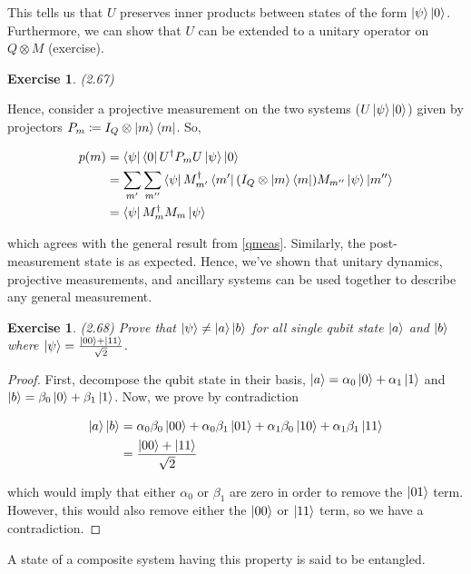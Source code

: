 \documentclass[11pt]{article}
\newcommand\0{\mathbf{0}}
\newcommand\<{\langle}
\renewcommand\>{\rangle}
\newtheorem{exercise}[theorem]{Exercise}
\begin{document}
This tells us that $U$ preserves inner products between states of the form $\ket{\psi}\ket{0}$. Furthermore, we can show that $U$ can be extended to a unitary operator on $Q \otimes M$ (exercise).

\begin{exercise}
(2.67)
\end{exercise}

Hence, consider a projective measurement on the two systems ($U\ket{\psi}\ket{0}$) given by projectors $P_m \coloneqq I_Q \otimes \ket{m}\bra{m}$. So,

\begin{align*}
p(m) &= \bra{\psi} \bra{0} U^\dag P_m U \ket{\psi} \ket{0} \\
&= \sum_{m'}\sum_{m''} \bra{\psi} M_{m'}^\dag \bra{m'} (I_Q \otimes \ket{m}\bra{m})M_{m''} \ket{\psi} \ket{m''} \\
&= \bra{\psi} M_m^\dag M_m \ket{\psi}
\end{align*}

which agrees with the general result from \ref{qmeas}. Similarly, the post-measurement state is as expected. Hence, we've shown that unitary dynamics, projective measurements, and ancillary systems can be used together to describe any general measurement.

\begin{exercise}
(2.68) Prove that $\ket{\psi} \neq \ket{a}\ket{b}$ for all single qubit state $\ket{a}$ and $\ket{b}$ where $\ket{\psi} = \frac{\ket{00} + \ket{11}}{\sqrt{2}}$.
\end{exercise}

\begin{proof}
	First, decompose the qubit state in their basis, $\ket{a} = \alpha_0 \ket{0} + \alpha_1 \ket{1}$ and $\ket{b} = \beta_0 \ket{0} + \beta_1 \ket{1}$. Now, we prove by contradiction
	
	\begin{align*}
	\ket{a}\ket{b} &= \alpha_0\beta_0 \ket{00} + \alpha_0\beta_1 \ket{01} + \alpha_1\beta_0 \ket{10} + \alpha_1\beta_1 \ket{11} \\
	&= \frac{\ket{00} + \ket{11}}{\sqrt{2}}
	\end{align*}

which would imply that either $\alpha_0$ or $\beta_1$ are zero in order to remove the $\ket{01}$ term. However, this would also remove either the $\ket{00}$ or $\ket{11}$ term, so we have a contradiction.
\end{proof}

A state of a composite system having this property is said to be entangled. 
\end{document}
